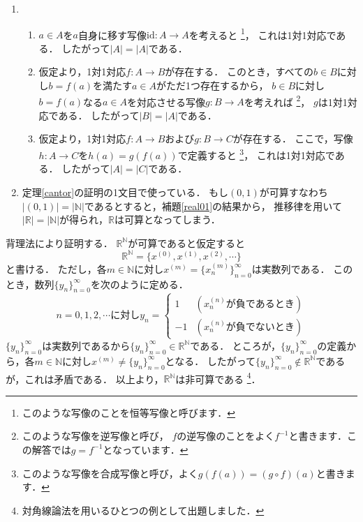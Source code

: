 ﻿\documentclass[./main]{subfiles} %
\theoremstyle{definition}
\begin{document}
\begin{enumerate}
\item
\begin{enumerate}
\item $a\in A$を$a$自身に移す写像$\mathrm{id}\colon A\to A$を考えると
\footnote{このような写像のことを恒等写像と呼びます．}，
これは1対1対応である．
したがって$|A|=|A|$である．
\item 仮定より，1対1対応$f\colon A\to B$が存在する．
このとき，すべての$b\in B$に対し$b=f(a)$を満たす$a\in A$がただ1つ存在するから，
$b\in B$に対し$b=f(a)$なる$a\in A$を対応させる写像$g\colon B\to A$を考えれば
\footnote{このような写像を逆写像と呼び，
$f$の逆写像のことをよく$f^{-1}$と書きます．この解答では$g=f^{-1}$となっています．}，
$g$は1対1対応である．
したがって$|B|=|A|$である．
\item 仮定より，1対1対応$f\colon A\to B$および$g\colon B\to C$が存在する．
ここで，写像$h\colon A\to C$を$h(a)=g(f(a))$で定義すると
\footnote{このような写像を合成写像と呼び，よく$g(f(a))=(g\circ f)(a)$と書きます．}，
これは1対1対応である．
したがって$|A|=|C|$である．
\end{enumerate}
\item 定理\ref{cantor}の証明の1文目で使っている．
もし$(0,1)$が可算すなわち$|(0,1)|=|\mathbb{N}|$であるとすると，補題\ref{real01}の結果から，
推移律を用いて$|\mathbb{R}|=|\mathbb{N}|$が得られ，$\mathbb{R}$は可算となってしまう．
\end{enumerate}

背理法により証明する．
$\mathbb{R}^\mathbb{N}$が可算であると仮定すると
\[ \mathbb{R}^\mathbb{N}=\{x^{(0)},x^{(1)},x^{(2)},\cdots\} \]
と書ける．
ただし，各$m\in\mathbb{N}$に対し$x^{(m)}=\{x_n^{(m)}\}_{n=0}^\infty$は実数列である．
このとき，数列$\{y_n\}_{n=0}^\infty$を次のように定める．
\[ n=0,1,2,\cdots に対し　y_n=
\begin{cases}
1 & (x_n^{(n)}が負であるとき) \\
-1 & (x_n^{(n)}が負でないとき)
\end{cases} \]
$\{y_n\}_{n=0}^\infty$は実数列であるから$\{y_n\}_{n=0}^\infty\in\mathbb{R}^\mathbb{N}$である．
ところが，$\{y_n\}_{n=0}^\infty$の定義から，各$m\in\mathbb{N}$に対し$x^{(m)}\neq\{y_n\}_{n=0}^\infty$となる．
したがって$\{y_n\}_{n=0}^\infty\notin\mathbb{R}^\mathbb{N}$であるが，これは矛盾である．
以上より，$\mathbb{R}^\mathbb{N}$は非可算である
\footnote{対角線論法を用いるひとつの例として出題しました．}．
\end{document}
